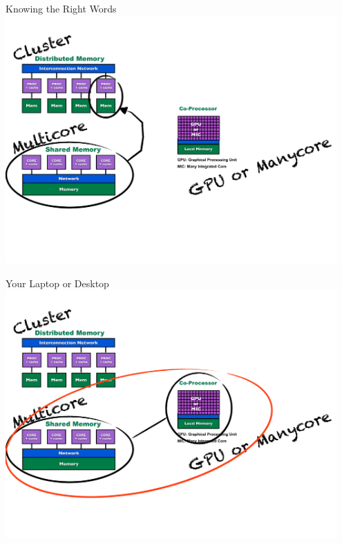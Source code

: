 \begin{frame}
\begin{block}{Knowing the Right Words}
    \includegraphics[width=0.95\textwidth]{pics/ParallelHardware3.pdf}
\end{block}
\end{frame}

\begin{frame}
\begin{block}{Your Laptop or Desktop}
    \includegraphics[width=0.95\textwidth]{pics/ParallelHardware4.pdf}
\end{block}
\end{frame}

